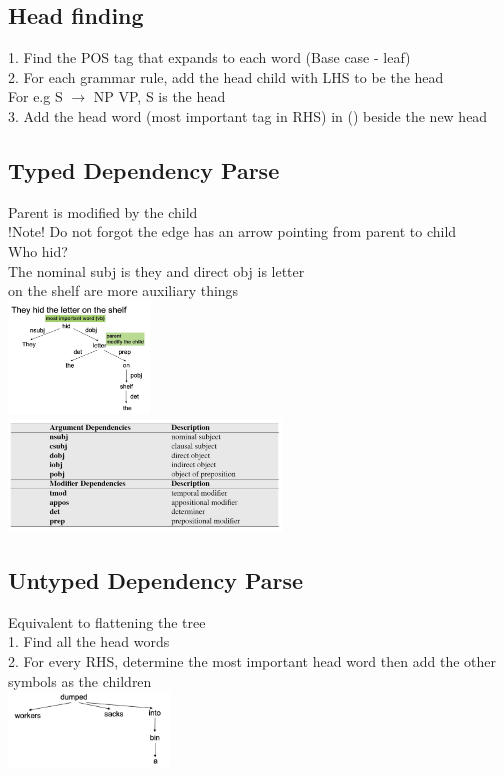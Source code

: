\documentclass[11pt]{article}
\begin{document}
\begin{multicols*}{4}
{\subsection*{Head finding}
1. Find the POS tag that expands to each word (Base case - leaf)\\
2. For each grammar rule, add the head child with LHS to be the head\\
For e.g S $\rightarrow$ NP VP, S is the head\\
3. Add the head word (most important tag in RHS) in () beside the new head
\subsection*{Typed Dependency Parse}
Parent is modified by the child\\
!Note! Do not forgot the edge has an arrow pointing from parent to child\\
Who hid? \\
The nominal subj is they and direct obj is letter
\\
on the shelf are more auxiliary things
\\
\includegraphics[height=3cm]{images/w10}
\\
\includegraphics[height=3cm]{images/w9}
\subsection*{Untyped Dependency Parse}
Equivalent to flattening the tree\\
1. Find all the head words\\
2. For every RHS, determine the most important head word then add the other symbols as the children\\
\includegraphics[height=2cm]{images/w11}
}
\end{multicols*}
\end{document}
